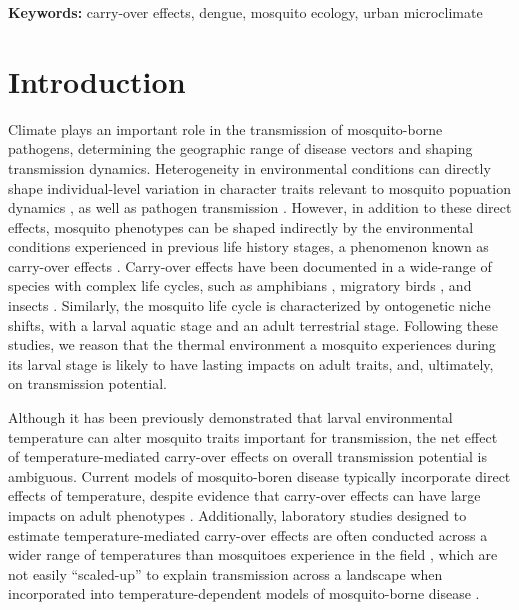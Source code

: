 \documentclass[12pt]{article}
\begin{document}
\smallskip

\textbf{Keywords:} carry-over effects, dengue, mosquito ecology, urban microclimate

\linenumbers
\doublespacing
\setlength\parindent{20pt}%

\newpage

\section{Introduction}

Climate plays an important role in the transmission of mosquito-borne pathogens, determining the geographic range of disease vectors and shaping transmission dynamics. Heterogeneity in environmental conditions can directly shape individual-level variation in character traits relevant to mosquito popuation dynamics \citep{delatte2009}, as well as pathogen transmission \citep{murdock2012}. However, in addition to these direct effects, mosquito phenotypes can be shaped indirectly by the environmental conditions experienced in previous life history stages, a phenomenon known as carry-over effects \citep{harrison2011}. Carry-over effects have been documented in a wide-range of species with complex life cycles, such as amphibians \citep{vonesh2005}, migratory birds \citep{norris2006}, and insects \citep{deblock2005a}. Similarly, the mosquito life cycle is characterized by ontogenetic niche shifts, with a larval aquatic stage and an adult terrestrial stage. Following these studies, we reason that the thermal environment a mosquito experiences during its larval stage is likely to have lasting impacts on adult traits, and, ultimately, on transmission potential.

Although it has been previously demonstrated that larval environmental temperature can alter mosquito traits important for transmission, the net effect of temperature-mediated carry-over effects on overall transmission potential is ambiguous. Current models of mosquito-boren disease typically incorporate direct effects of temperature, despite evidence that carry-over effects can have large impacts on adult phenotypes \citep{muturi2011c, muturi2011a, price2015}. Additionally, laboratory studies designed to estimate temperature-mediated carry-over effects are often conducted across a wider range of temperatures than mosquitoes experience in the field \citep{cator2013}, which are not easily ``scaled-up'' to explain transmission across a landscape when incorporated into temperature-dependent models of mosquito-borne disease \citep{reiner2013}.
\end{document}
